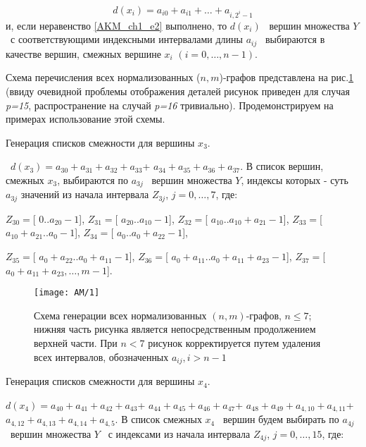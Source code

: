 \begin{equation*}
d(x_i)=a_{i0}+a_{i1}+\dots +a_{i,2^i-1}
\end{equation*}
и, если неравенство \eqref{AKM_ch1_e2} выполнено, то  $d(x_i)$ \ вершин множества  $Y$ \ с соответствующими индексными интервалами
длины  $a_{\mathit{ij}}$ \ выбираются в качестве вершин, смежных вершине  $x_i$ $(i=0,\dots ,n-1)$.

Схема перечисления всех нормализованных ($n,m$)-графов представлена на рис.\ref{AKM_ch1_img1} (ввиду очевидной проблемы отображения
деталей рисунок приведен для случая \foreignlanguage{english}{\textit{p}}\textit{=15}, распространение на случай
\foreignlanguage{english}{\textit{p}}\textit{=16} тривиально). Продемонстрируем на примерах использование этой схемы.

\begin{example}\label{AKM_ch1_ex1}
	Генерация списков смежности для вершины  $x_3$.
\end{example}

\  $d(x_3)=a_{30}+a_{31}+a_{32}+a_{33}$+ $a_{34}+a_{35}+a_{36}+a_{37}$. В список вершин, смежных  $x_3$, выбираются по
$a_{3j}$ \ вершин множества  $Y$, индексы которых - суть  $a_{3j}$ значений из начала интервала  $Z_{3j}$,
$j=0,\dots ,7$, где:

$Z_{30}=$[ $0..a_{20}-1$],  $Z_{31}=$[ $a_{20}..a_{10}-1$],  $Z_{32}=$[ $a_{10}..a_{10}+a_{21}-1$],  $Z_{33}=$[
$a_{10}+a_{21}..a_0-1$],  $Z_{34}=$[ $a_0..a_0+a_{22}-1$],

$Z_{35}=$[ $a_0+a_{22}..a_0+a_{11}-1$],  $Z_{36}=$[ $a_0+a_{11}..a_0+a_{11}+a_{23}-1$],  $Z_{37}=$[
$a_0+a_{11}+a_{23},\dots ,m-1$].

\begin{figure}[H]\label{AKM_ch1_img1}
	\centering
	\texttt{[image: AM/1]}
	\caption{Схема генерации всех нормализованных $(n,m)$-графов, $n \leq 7$; нижняя часть рисунка является непосредственным продолжением верхней части. При $n<7$ рисунок корректируется путем удаления всех интервалов, обозначенных $a_{ij},i>n-1$}
\end{figure}

\begin{example}\label{AKM_ch1_ex2}
	Генерация списков смежности для вершины  $x_4$.
\end{example}

$d(x_4)=a_{40}+a_{41}+a_{42}+a_{43}$+ $a_{44}+a_{45}+a_{46}+a_{47}$+ $a_{48}+a_{49}+a_{4,10}+a_{4,11}$+
$a_{4,12}+a_{4,13}+a_{4,14}+a_{4,5}$. В список смежных  $x_4$ \ вершин будем выбирать по  $a_{4j}$ \ вершин множества
$Y$ \ с индексами из начала интервала  $Z_{4j}$,  $j=0,\dots ,15$, где:

